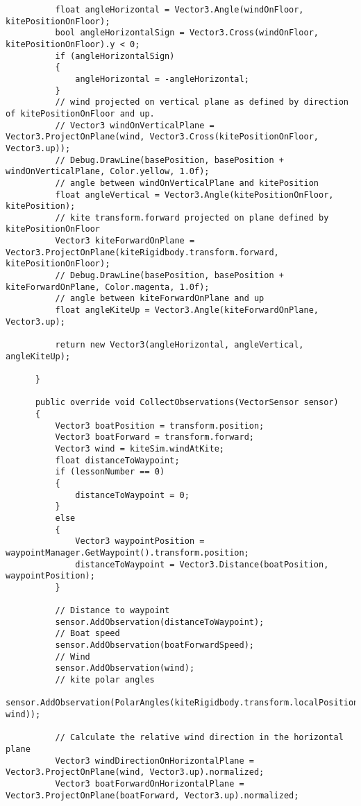 \begin{lstlisting}
          float angleHorizontal = Vector3.Angle(windOnFloor, kitePositionOnFloor);
          bool angleHorizontalSign = Vector3.Cross(windOnFloor, kitePositionOnFloor).y < 0;
          if (angleHorizontalSign)
          {
              angleHorizontal = -angleHorizontal;
          }
          // wind projected on vertical plane as defined by direction of kitePositionOnFloor and up.
          // Vector3 windOnVerticalPlane = Vector3.ProjectOnPlane(wind, Vector3.Cross(kitePositionOnFloor, Vector3.up));
          // Debug.DrawLine(basePosition, basePosition + windOnVerticalPlane, Color.yellow, 1.0f);
          // angle between windOnVerticalPlane and kitePosition
          float angleVertical = Vector3.Angle(kitePositionOnFloor, kitePosition);
          // kite transform.forward projected on plane defined by kitePositionOnFloor
          Vector3 kiteForwardOnPlane = Vector3.ProjectOnPlane(kiteRigidbody.transform.forward, kitePositionOnFloor);
          // Debug.DrawLine(basePosition, basePosition + kiteForwardOnPlane, Color.magenta, 1.0f);
          // angle between kiteForwardOnPlane and up
          float angleKiteUp = Vector3.Angle(kiteForwardOnPlane, Vector3.up);
  
          return new Vector3(angleHorizontal, angleVertical, angleKiteUp);
  
      }
  
      public override void CollectObservations(VectorSensor sensor)
      {
          Vector3 boatPosition = transform.position;
          Vector3 boatForward = transform.forward;
          Vector3 wind = kiteSim.windAtKite;
          float distanceToWaypoint;
          if (lessonNumber == 0)
          {
              distanceToWaypoint = 0;
          }
          else 
          {
              Vector3 waypointPosition = waypointManager.GetWaypoint().transform.position;
              distanceToWaypoint = Vector3.Distance(boatPosition, waypointPosition);
          }
  
          // Distance to waypoint
          sensor.AddObservation(distanceToWaypoint);
          // Boat speed
          sensor.AddObservation(boatForwardSpeed);
          // Wind
          sensor.AddObservation(wind);
          // kite polar angles
          sensor.AddObservation(PolarAngles(kiteRigidbody.transform.localPosition, wind));
  
          // Calculate the relative wind direction in the horizontal plane
          Vector3 windDirectionOnHorizontalPlane = Vector3.ProjectOnPlane(wind, Vector3.up).normalized;
          Vector3 boatForwardOnHorizontalPlane = Vector3.ProjectOnPlane(boatForward, Vector3.up).normalized;
  

\end{lstlisting}
